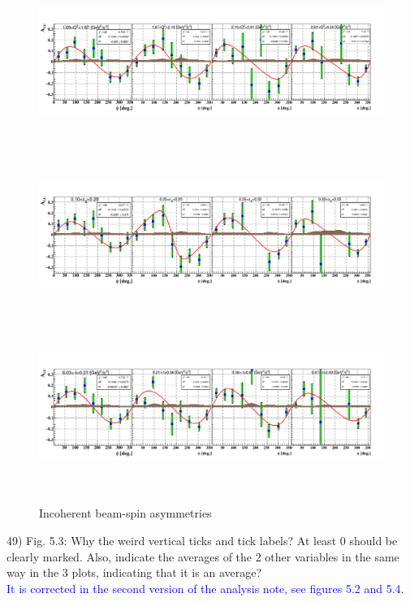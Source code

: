  \begin{figure}[tbp]
 \centering
 \includegraphics[height=5.5cm]{fig/incoh_Q2_phi.png}
 \includegraphics[height=5.5cm]{fig/incoh_xB_phi.png}
 \includegraphics[height=5.5cm]{fig/incoh_t_phi.png}
 \caption{Incoherent beam-spin asymmetries}
 \label{fig:incoh_alu_sep}
 \end{figure}



49) Fig. 5.3: Why the weird vertical ticks and tick labels? At least 0 should 
be clearly marked. Also, indicate the averages of the 2 other variables in the 
same way in the 3 plots, indicating that it is an average? \\
\textcolor{blue}{It is corrected in the second version of the analysis note, 
see figures 5.2 and 5.4.} \\

